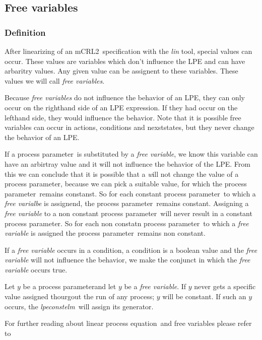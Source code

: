 \documentclass[a4paper,10pt]{article}
\theoremstyle{plain}
\theoremstyle{definition}
\newcommand{\lpe}{linear process equation}
\newcommand{\tool}{\textit{lpeconstelm}}
\newcommand{\mcrl}{mCRL2}
\newcommand{\pp}{process parameter}
\newcommand{\ti}{\textit}
\begin{document}
\subsection{Free variables}

\subsubsection{Definition}
After linearizing of an \mcrl\ specification with the \ti{lin} tool, special values can occur.
These values are variables which don't influence the LPE and can have arbaritry values. Any given value
can be assignent to these variables. These values we will call \ti{free variables}. 

Because \ti{free variables} do not influence the behavior of an LPE, they can only occur on the righthand side of an LPE expression. If they had occur on the lefthand side, they would influence the behavior. Note that it is possible free variables can occur in actions, conditions and nexststates, but they never change the behavior of an LPE. 

If a \pp\ is substituted by a \ti{free variable}, we know this variable can have an arbirtray value and it will not influence the behavior of the LPE. From this we can conclude that it is possible that a \ti will not change the value of a \pp , because we can pick a suitable value, for which the \pp\ remains constanst. So for each constant \pp\ to which a \ti{free varialbe} is assignend, the \pp\ remains constant. Assigning a \ti{free variable} to a non constant \pp\ will never result in a constant \pp . So for each non constatn \pp\ to which a \ti{free variable} is assigned the \pp\ remains non constant.

If a \ti{free variable} occurs in a condition, a condition is a boolean value and the \ti{free variable} will not influence the behavior, we make the conjunct in which the \ti{free variable} occurs true. 


Let $y$ be a \pp and let $y$ be a \ti{free variable}. If $y$ never gets a specific value assigned thourgout the run of any process; $y$ will be constant.
If such an $y$ occurs, the \tool\ will assign its generator. 

For further reading about \lpe\ and free variables please refer to \cite{LPEfreevar} 
\end{document}
